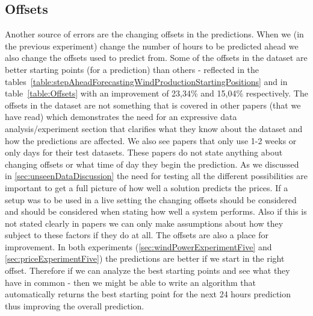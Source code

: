 \subsection{Offsets}
\label{sec:offsetsDiscussion}
Another source of errors are the changing offsets in the predictions. When we (in the previous experiment) change the number of hours to be predicted ahead we also change the offsets used to predict from. Some of the offsets in the dataset are better starting points (for a prediction) than others - reflected in the tables~\ref{table:stepAheadForecastingWindProductionStartingPositions} and in table~\ref{table:Offsets} with an improvement of 23,34\% and 15,04\% respectively. The offsets in the dataset are not something that is covered in other papers (that we have read) which demonstrates the need for an expressive data analysis/experiment section that clarifies what they know about the dataset and how the predictions are affected. We also see papers that only use 1-2 weeks\cite{yamin2004adaptive} or only days \cite{1, singhal2011electricity, pjmForecast} for their test datasets. These papers do not state anything about changing offsets or what time of day they begin the prediction. As we discussed in \ref{sec:unseenDataDiscussion} the need for testing all the different possibilities are important to get a full picture of how well a solution predicts the prices. If a setup was to be used in a live setting the changing offsets should be considered and should be considered when stating how well a system performs. Also if this is not stated clearly in papers we can only make assumptions about how they subject to these factors if they do at all. The offsets are also a place for improvement. In both experiments (\ref{sec:windPowerExperimentFive} and \ref{sec:priceExperimentFive}) the predictions are better if we start in the right offset. Therefore if we can analyze the best starting points and see what they have in common - then we might be able to write an algorithm that automatically returns the best starting point for the next 24 hours prediction thus improving the overall prediction.